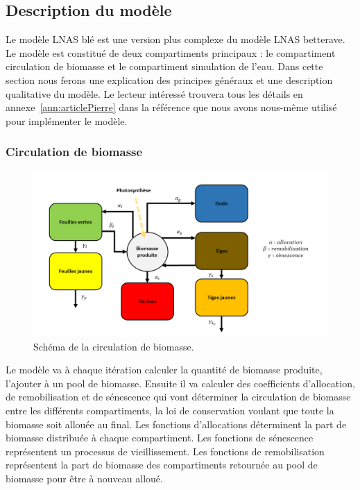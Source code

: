 \subsection{Description du modèle}

Le modèle LNAS blé est une version plus complexe du modèle LNAS betterave. Le modèle est constitué de deux compartiments principaux : le compartiment circulation de biomasse et le compartiment simulation de l'eau. Dans cette section nous ferons une explication des principes généraux et une description qualitative du modèle. Le lecteur intéressé trouvera tous les détails en annexe~\ref{ann:articlePierre} dans  la référence que nous avons nous-même utilisé pour implémenter le modèle.

\subsubsection{Circulation de biomasse}

\begin{figure}[H]

\begin{center}
 \includegraphics[scale = 0.42]{./img/modelSchema.png}
 \caption{Schéma de la circulation de biomasse.}
 \label{fig:schemaModel}
\end{center}

\end{figure}

Le modèle va à chaque itération calculer la quantité de biomasse produite, l'ajouter à un pool de biomasse. Ensuite il va calculer des coefficients d'allocation, de remobilisation et de sénescence qui vont déterminer la circulation de biomasse entre les différents compartiments, la loi de conservation voulant que toute la biomasse soit allouée au final. 
Les fonctions d'allocations déterminent la part de biomasse distribuée à chaque compartiment. Les fonctions de sénescence représentent un processus de vieillissement. Les fonctions de remobilisation représentent la part de biomasse des compartiments retournée au pool de biomasse pour être à nouveau alloué.


